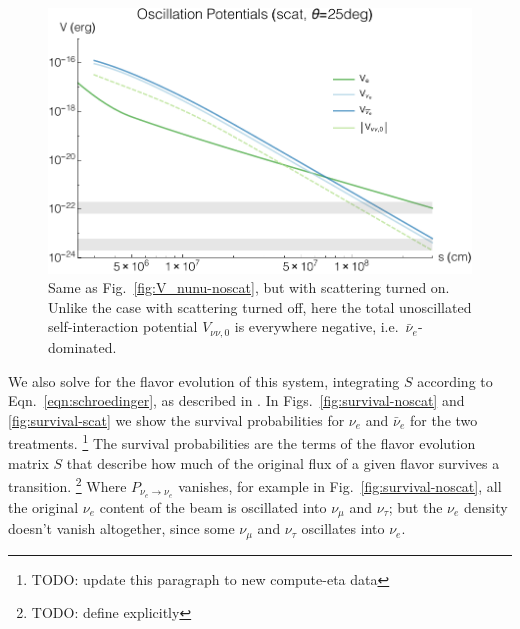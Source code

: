 \documentclass[aps,floatfix,prd,superscriptaddress,twocolumn]{revtex4-1}
\begin{document}
\begin{figure}
  \includegraphics[width=\columnwidth]{20171223-potentials-Ve_Vnue_Vnua_Vnu-000Mo-025deg-scat}
  \caption{Same as Fig.~\ref{fig:V_nunu-noscat},
    but with scattering turned on.
    Unlike the case with scattering turned off,
    here the total unoscillated self-interaction potential $V_{\nu\nu,0}$
    is everywhere negative, i.e.\ $\bar{\nu}_e$-dominated.
    }
  \label{fig:V_nunu-scat}
\end{figure}

We also solve for the flavor evolution of this system,
integrating $S$ according to Eqn.~\ref{eqn:schroedinger},
as described in \cite{zhu2016-mnr_nsns_remnant}.
In Figs.~\ref{fig:survival-noscat} and \ref{fig:survival-scat}
we show the survival probabilities for $\nu_e$ and $\bar{\nu}_e$
for the two treatments.
\footnote{TODO: update this paragraph to new compute-eta data}
The survival probabilities are the terms of
the flavor evolution matrix $S$ that describe how much of the original flux
of a given flavor survives a transition.
\footnote{TODO: define explicitly}
Where $P_{\nu_e\rightarrow\nu_e}$ vanishes, for example in
Fig.~\ref{fig:survival-noscat}, all the original $\nu_e$ content of the beam
is oscillated into $\nu_\mu$ and $\nu_\tau$; but the $\nu_e$ density doesn't
vanish altogether,
since some $\nu_\mu$ and $\nu_\tau$ oscillates into $\nu_e$.
\end{document}
